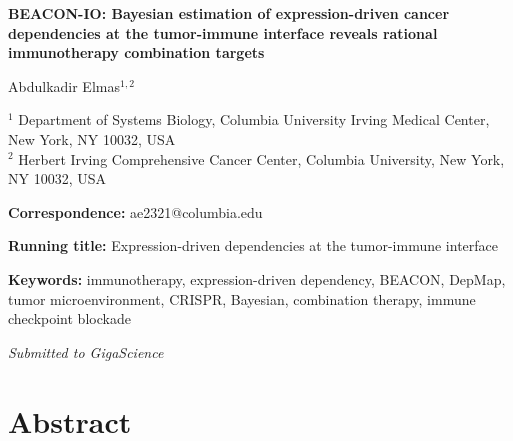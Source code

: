 \documentclass[12pt]{article}
\begin{document}

\begin{titlepage}
\begin{center}

\vspace*{2cm}

{\LARGE \textbf{BEACON-IO: Bayesian estimation of expression-driven cancer dependencies at the tumor-immune interface reveals rational immunotherapy combination targets}}

\vspace{1.5cm}

{\large
Abdulkadir Elmas$^{1,2}$
}

\vspace{1cm}

{\normalsize
$^{1}$ Department of Systems Biology, Columbia University Irving Medical Center, New York, NY 10032, USA\\
$^{2}$ Herbert Irving Comprehensive Cancer Center, Columbia University, New York, NY 10032, USA\\
}

\vspace{1cm}

{\normalsize
\textbf{Correspondence:} ae2321@columbia.edu
}

\vspace{1cm}

{\normalsize
\textbf{Running title:} Expression-driven dependencies at the tumor-immune interface
}

\vspace{1cm}

{\normalsize
\textbf{Keywords:} immunotherapy, expression-driven dependency, BEACON, DepMap, tumor microenvironment, CRISPR, Bayesian, combination therapy, immune checkpoint blockade
}

\vspace{2cm}

{\normalsize \textit{Submitted to GigaScience}}

\end{center}
\end{titlepage}

\section*{Abstract}
\end{document}
